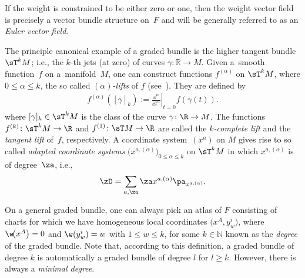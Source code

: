 \begin{Example} If the weight is constrained to be either zero or one, then the weight vector f\/ield is precisely a vector bundle structure on~$F$ and will be generally referred to as an \emph{Euler vector field}.
\end{Example}
\begin{Example} The principle canonical example of a graded bundle is the higher tangent bundle~$\sT^{k}M$; i.e., the $k$-th jets (at zero) of curves $\gamma\colon \mathbb{R} \rightarrow M$. Given a~smooth function~$f$ on a~mani\-fold~$M$, one can construct functions $f^{(\alpha)}$ on $\sT^k M$, where $0\leq \alpha\leq k$, the so called \emph{$(\alpha)$-lifts} of $f$ (see~\cite{Morimoto_Lifts}). They are def\/ined by
\begin{gather*}
f^{(\alpha)}([\gamma]_k):= \left.\frac{\dd^\alpha}{\dd t^\alpha}\right|_{t=0} f(\gamma(t)).
\end{gather*}
where $[\gamma]_k\in \sT^k M$ is the class of the curve $\gamma\colon \R\rightarrow M$. The functions $f^{(k)}\colon \sT^k M\to \R$ and $f^{(1)}\colon \sT M\to \R$ are called the \emph{$k$-complete lift} and the \emph{tangent lift} of~$f$, respectively. A coordinate system~$(x^a)$ on $M$ gives rise to so called \emph{adapted coordinate systems} $\big(x^{a, (\alpha)}\big)_{0\leq \alpha \leq k}$ on $\sT^k M$ in which $x^{a, (\alpha)}$ is of degree~$\za$, i.e.,
\begin{gather*}\zD=\sum_{a,\za}\za x^{a, (\alpha)}\pa_{x^{a, (\alpha)}}.
\end{gather*}
\end{Example}


On a general graded bundle, one can always pick an atlas of $F$ consisting of charts for which we have homogeneous local coordinates $\big(x^{A},y_{w}^{i}\big)$, where $\w\!\big(x^{A}\big) =0$ and $\w(y_{w}^{i}) = w$ with $1\leq w\leq k$, for some $k \in \mathbb{N}$ known as the \emph{degree} of the graded bundle. Note that, according to this def\/inition, a graded bundle of degree $k$ is automatically a graded bundle of degree $l$ for $l\ge k$. However, there is always a \emph{minimal degree}.

